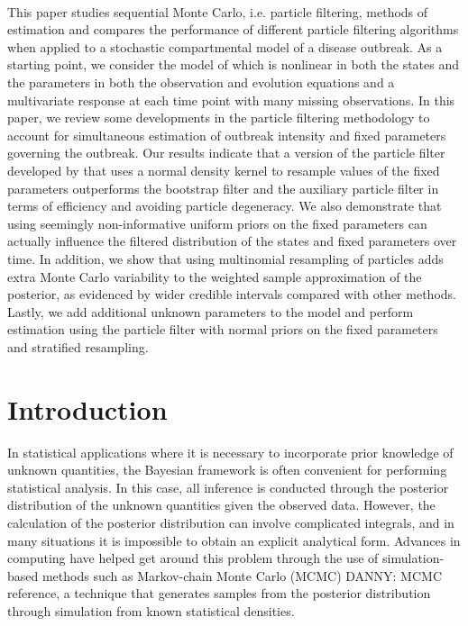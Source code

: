\documentclass{elsarticle}
\newcommand{\danny}[1]{{\color{blue}DANNY: #1}}
\begin{document}
 \\

This paper studies sequential Monte Carlo, i.e. particle filtering, methods of estimation and compares the performance of different particle filtering algorithms when applied to a stochastic compartmental model of a disease outbreak. As a starting point, we consider the model of \citet{skvortsov2012monitoring} which is nonlinear in both the states and the parameters in both the observation and evolution equations and a multivariate response at each time point with many missing observations. In this paper, we review some developments in the particle filtering methodology to account for simultaneous estimation of outbreak intensity and fixed parameters governing the outbreak. Our results indicate that a version of the particle filter developed by \citet{Liu:West:comb:2001} that uses a normal density kernel to resample values of the fixed parameters outperforms the bootstrap filter and the auxiliary particle filter in terms of efficiency and avoiding particle degeneracy. We also demonstrate that using seemingly non-informative uniform priors on the fixed parameters can actually influence the filtered distribution of the states and fixed parameters over time.  In addition, we show that using multinomial resampling of particles adds extra Monte Carlo variability to the weighted sample approximation of the posterior, as evidenced by wider credible intervals compared with other methods.  Lastly, we add additional unknown parameters to the model and perform estimation using the \citet{Liu:West:comb:2001} particle filter with normal priors on the fixed parameters and stratified resampling.

\section{Introduction} \label{sec:intro}

In statistical applications where it is necessary to incorporate prior knowledge of unknown quantities, the Bayesian framework is often convenient for performing statistical analysis.  In this case, all inference is conducted through the posterior distribution of the unknown quantities given the observed data.  However, the calculation of the posterior distribution can involve complicated integrals, and in many situations it is impossible to obtain an explicit analytical form.  Advances in computing have helped get around this problem through the use of simulation-based methods such as Markov-chain Monte Carlo (MCMC) \danny{MCMC reference}, a technique that generates samples from the posterior distribution through simulation from known statistical densities.
\end{document}
